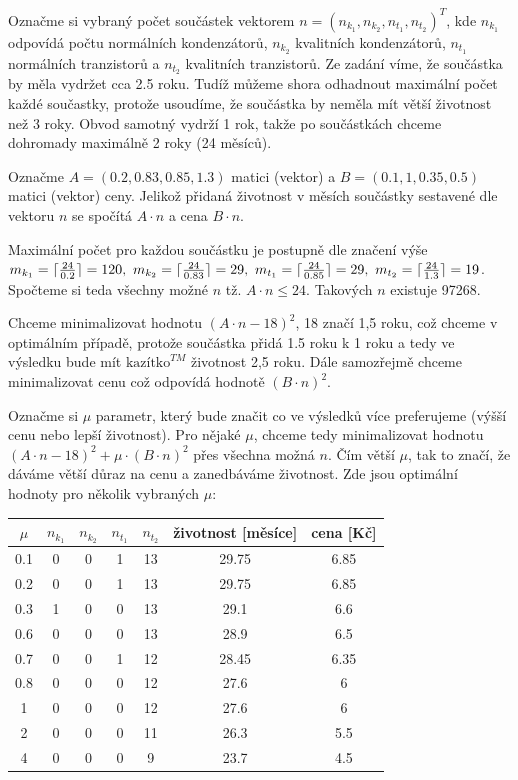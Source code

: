 \documentclass[12pt, a4paper]{article}
\DeclarePairedDelimiter{\ceil}{\lceil}{\rceil}
\begin{document}
\section{}
Označme si vybraný počet součástek vektorem $n=(n_{k_1},n_{k_2},n_{t_1},n_{t_2})^T$, kde $n_{k_1}$ odpovídá počtu normálních kondenzátorů, $n_{k_2}$ kvalitních kondenzátorů, $n_{t_1}$ normálních tranzistorů a $n_{t_2}$ kvalitních tranzistorů. Ze zadání víme, že součástka by měla vydržet cca 2.5 roku. Tudíž můžeme shora odhadnout maximální počet každé součastky, protože usoudíme, že součástka by neměla mít větší životnost než 3 roky. Obvod samotný vydrží 1 rok, takže po součástkách chceme dohromady maximálně 2 roky (24 měsíců).

Označme $A = (0.2,0.83,0.85,1.3)$ matici (vektor)  a $B = (0.1,1,0.35,0.5)$ matici (vektor) ceny. Jelikož přidaná životnost v měsích součástky sestavené dle vektoru $n$ se spočítá $A \cdot n$ a cena $B \cdot n$.

Maximální počet pro každou součástku je postupně dle značení výše $m_{k_1}=\ceil{\frac{24}{0.2}}=120, \ m_{k_2}=\ceil{\frac{24}{0.83}}=29, \ m_{t_1}=\ceil{\frac{24}{0.85}}=29,\ m_{t_2}=\ceil{\frac{24}{1.3}}=19$. Spočteme si teda všechny možné $n$ tž. $A \cdot n \leq 24$. Takových $n$ existuje 97268.

Chceme minimalizovat hodnotu $(A \cdot n - 18)^2$, 18 značí 1,5 roku, což chceme v optimálním případě, protože součástka přidá 1.5 roku k 1 roku a tedy ve výsledku bude mít $\text{kazítko}^{TM}$ životnost 2,5 roku. Dále samozřejmě chceme minimalizovat cenu což odpovídá hodnotě $(B \cdot n)^2$.

Označme si $\mu$ parametr, který bude značit co ve výsledků více preferujeme (výšší cenu nebo lepší životnost). Pro nějaké $\mu$, chceme tedy minimalizovat hodnotu $(A \cdot n - 18)^2 + \mu \cdot (B \cdot n)^2$ přes všechna možná $n$. Čím větší $\mu$, tak to značí, že dáváme větší důraz na cenu a zanedbáváme životnost. Zde jsou optimální hodnoty pro několik vybraných $\mu$:

\begin{center}
\begin{tabular}{ |c|c|c|c|c|c|c| } 
\hline
$\mu$ & $n_{k_1}$ & $n_{k_2}$ & $n_{t_1}$ & $n_{t_2}$ & \textbf{životnost [měsíce]} & \textbf{cena [Kč]} \\
\hline
0.1 & 0 & 0 & 1 & 13 & 29.75 & 6.85\\
0.2 & 0 & 0 & 1 & 13 & 29.75 & 6.85\\
0.3 & 1 & 0 & 0 & 13 & 29.1 & 6.6\\
0.6 & 0 & 0 & 0 & 13 & 28.9 & 6.5\\
0.7 & 0 & 0 & 1 & 12 & 28.45 & 6.35\\
0.8 & 0 & 0 & 0 & 12 & 27.6 & 6\\
1 & 0 & 0 & 0 & 12 & 27.6 & 6\\
2 & 0 & 0 & 0 & 11 & 26.3 & 5.5\\
4 & 0 & 0 & 0 & 9 & 23.7 & 4.5\\
\hline
\end{tabular}
\end{center}
\end{document}
